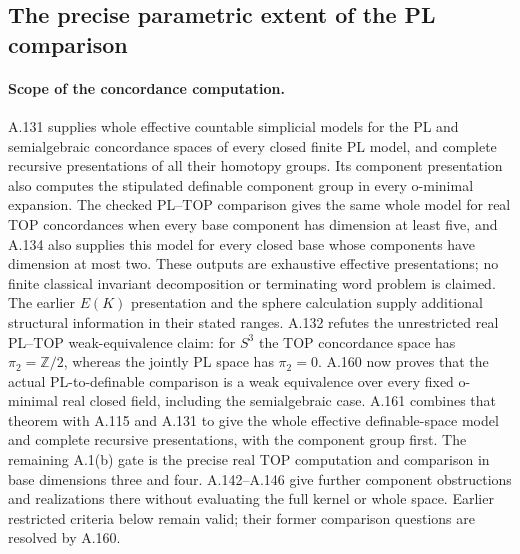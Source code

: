 \subsection{The precise parametric extent of the PL comparison}

\paragraph{Scope of the concordance computation.}
A.131 supplies whole effective countable simplicial models for the
PL and semialgebraic concordance spaces of every closed finite PL
model, and complete recursive presentations of all their homotopy
groups. Its component presentation also computes the stipulated
definable component group in every o-minimal expansion. The checked
PL--TOP comparison gives the same whole model for real TOP
concordances when every base component has dimension at least five,
and A.134 also supplies this model for every closed base whose
components have dimension at most two.
These outputs are exhaustive effective presentations; no finite
classical invariant decomposition or terminating word problem is
claimed. The earlier $E(K)$ presentation and the sphere calculation
supply additional structural information in their stated ranges.
A.132 refutes the unrestricted real PL--TOP weak-equivalence
claim: for $S^3$ the TOP concordance space has $\pi_2=\mathbb Z/2$,
whereas the jointly PL space has $\pi_2=0$. A.160 now proves that
the actual PL-to-definable comparison is a weak equivalence over
every fixed o-minimal real closed field, including the semialgebraic
case. A.161 combines that theorem with A.115 and A.131 to give the
whole effective definable-space model and complete recursive
presentations, with the component group first. The remaining A.1(b)
gate is the precise real TOP computation and comparison in base
dimensions three and four. A.142--A.146 give further component
obstructions and realizations there without evaluating the full
kernel or whole space. Earlier restricted criteria below remain
valid; their former comparison questions are resolved by A.160.


